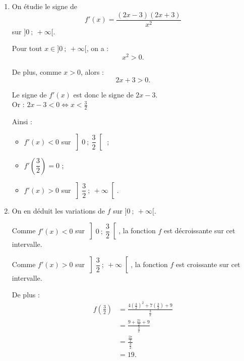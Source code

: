 \begin{enumerate}
\begin{enumerate}
De plus, pour tout $x\in]0\ ;\ +\infty[$, on a $v(x)=x\neq 0$.

On peut donc appliquer la formule de dérivation d’un quotient :
$$
\left(\frac{u}{v}\right)'=\frac{u'v-uv'}{v^2}.
$$

Ainsi, pour tout $x\in]0\ ;\ +\infty[$ :
\begin{align*}
	f'(x)
	&=\frac{u'(x)v(x)-u(x)v'(x)}{\left(v(x)\right)^2}\\
	&=\frac{(8x+7)\times x-(4x^2+7x+9)\times 1}{x^2}\\
	&=\frac{8x^2+7x-4x^2-7x-9}{x^2}\\
	&=\frac{4x^2-9}{x^2}\\
	&=\frac{(2x-3)(2x+3)}{x^2}.
\end{align*}

Donc, pour tout $x\in]0\ ;\ +\infty[$,
$$
f'(x)=\frac{(2x-3)(2x+3)}{x^2}.
$$


\item On étudie le signe de
$$
f'(x)=\frac{(2x-3)(2x+3)}{x^2}
$$
sur $]0\ ;\ +\infty[$.

Pour tout $x\in]0\ ;\ +\infty[$, on a :
\[
x^2>0.
\]

De plus, comme $x>0$, alors :
\[
2x+3>0.
\]

Le signe de $f'(x)$ est donc le signe de $2x-3$.\\
Or :
$
2x-3<0 \iff x<\frac{3}{2}$



Ainsi :
\begin{itemize}[left=5mm,label={\textbullet~~}]
\item $f'(x)<0$ sur $\left]0\ ;\ \dfrac{3}{2}\right[$ ;
\item $f'\left(\dfrac{3}{2}\right)=0$ ;
\item $f'(x)>0$ sur $\left]\dfrac{3}{2}\ ;\ +\infty\right[$.
\end{itemize}

\item On en déduit les variations de $f$ sur $]0\ ;\ +\infty[$.

Comme $f'(x)<0$ sur $\left]0\ ;\ \dfrac{3}{2}\right[$, la fonction $f$ est décroissante sur cet intervalle.

Comme $f'(x)>0$ sur $\left]\dfrac{3}{2}\ ;\ +\infty\right[$, la fonction $f$ est croissante sur cet intervalle.

De plus :
\begin{align*}
	f\left(\frac{3}{2}\right)
	&=\frac{4\left(\frac{3}{2}\right)^2+7\left(\frac{3}{2}\right)+9}{\frac{3}{2}}\\
	&=\frac{9+\frac{21}{2}+9}{\frac{3}{2}}\\
	&=\frac{\frac{57}{2}}{\frac{3}{2}}\\
	&=19.
\end{align*}


\end{enumerate}
\end{enumerate}
